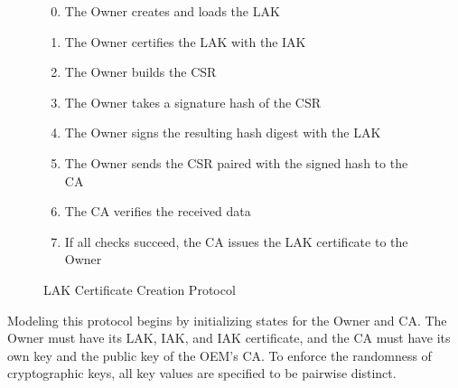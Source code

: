 \documentclass[runningheads]{llncs}
\begin{document}
\begin{figure}[hpbt]
  \vspace{-\medskipamount}
  \vspace{-\medskipamount}

  \begin{enumerate}[itemsep=0pt,parsep=0pt,partopsep=0pt]
  \setcounter{enumi}{-1}
  \item The Owner creates and loads the LAK
  \item The Owner certifies the LAK with the IAK
  \item The Owner builds the CSR%
  \item The Owner takes a signature hash of the CSR
  \item The Owner signs the resulting hash digest with the LAK
  \item The Owner sends the CSR paired with the signed hash to the CA
  \item The CA verifies the received data%
  \item If all checks succeed, the CA issues the LAK certificate to the Owner
  \end{enumerate}
  \caption{LAK Certificate Creation Protocol}
  \label{fig:lak-certificate-creation}
\end{figure}

Modeling this protocol begins by initializing states for the Owner and
CA. The Owner must have its LAK, IAK, and IAK certificate, and the CA
must have its own key and the public key of the OEM's CA.  
To enforce the randomness of cryptographic
keys, all key values are specified to be pairwise distinct.
\end{document}
